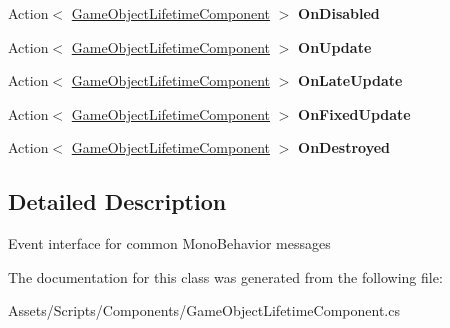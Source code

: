 \begin{DoxyCompactItemize}
\item 
\hypertarget{class_hattori_game2_1_1_core_1_1_components_1_1_game_object_lifetime_component_a59b4077cbaff24b440fe644dd2e24e82}{}Action$<$ \hyperlink{class_hattori_game2_1_1_core_1_1_components_1_1_game_object_lifetime_component}{Game\+Object\+Lifetime\+Component} $>$ {\bfseries On\+Disabled}\label{class_hattori_game2_1_1_core_1_1_components_1_1_game_object_lifetime_component_a59b4077cbaff24b440fe644dd2e24e82}

\item 
\hypertarget{class_hattori_game2_1_1_core_1_1_components_1_1_game_object_lifetime_component_a4654693b0de48d74919bcddb8aa4c9dc}{}Action$<$ \hyperlink{class_hattori_game2_1_1_core_1_1_components_1_1_game_object_lifetime_component}{Game\+Object\+Lifetime\+Component} $>$ {\bfseries On\+Update}\label{class_hattori_game2_1_1_core_1_1_components_1_1_game_object_lifetime_component_a4654693b0de48d74919bcddb8aa4c9dc}

\item 
\hypertarget{class_hattori_game2_1_1_core_1_1_components_1_1_game_object_lifetime_component_abb4184b204ea52d2083b3e81176f16ad}{}Action$<$ \hyperlink{class_hattori_game2_1_1_core_1_1_components_1_1_game_object_lifetime_component}{Game\+Object\+Lifetime\+Component} $>$ {\bfseries On\+Late\+Update}\label{class_hattori_game2_1_1_core_1_1_components_1_1_game_object_lifetime_component_abb4184b204ea52d2083b3e81176f16ad}

\item 
\hypertarget{class_hattori_game2_1_1_core_1_1_components_1_1_game_object_lifetime_component_ad3b07ba09cc1c3cd8b7531609d299b17}{}Action$<$ \hyperlink{class_hattori_game2_1_1_core_1_1_components_1_1_game_object_lifetime_component}{Game\+Object\+Lifetime\+Component} $>$ {\bfseries On\+Fixed\+Update}\label{class_hattori_game2_1_1_core_1_1_components_1_1_game_object_lifetime_component_ad3b07ba09cc1c3cd8b7531609d299b17}

\item 
\hypertarget{class_hattori_game2_1_1_core_1_1_components_1_1_game_object_lifetime_component_aa39cbd7a4331aa0595f4edfd2d2edf38}{}Action$<$ \hyperlink{class_hattori_game2_1_1_core_1_1_components_1_1_game_object_lifetime_component}{Game\+Object\+Lifetime\+Component} $>$ {\bfseries On\+Destroyed}\label{class_hattori_game2_1_1_core_1_1_components_1_1_game_object_lifetime_component_aa39cbd7a4331aa0595f4edfd2d2edf38}

\end{DoxyCompactItemize}


\subsection{Detailed Description}
Event interface for common Mono\+Behavior messages 



The documentation for this class was generated from the following file\+:\begin{DoxyCompactItemize}
\item 
Assets/\+Scripts/\+Components/Game\+Object\+Lifetime\+Component.\+cs\end{DoxyCompactItemize}
